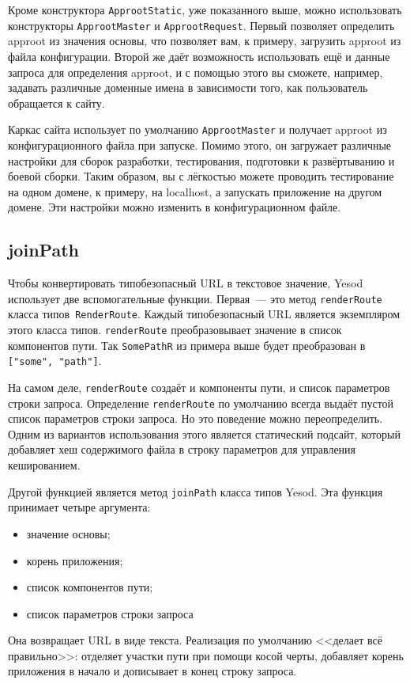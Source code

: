Кроме конструктора \lstinline!ApprootStatic!, уже показанного выше, можно
использовать конструкторы \lstinline!ApprootMaster! и
\lstinline!ApprootRequest!.  Первый позволяет определить approot из значения
основы, что позволяет вам, к примеру, загрузить approot из файла конфигурации.
Второй же даёт возможность использовать ещё и данные запроса для определения
approot, и с помощью этого вы сможете, например, задавать различные доменные
имена в зависимости того, как пользователь обращается к сайту.

Каркас сайта использует по умолчанию \lstinline!ApprootMaster!  и получает
approot из конфигурационного файла при запуске. Помимо этого, он загружает
различные настройки для сборок разработки, тестирования, подготовки к
развёртыванию и боевой сборки. Таким образом, вы с лёгкостью можете проводить
тестирование на одном домене, к примеру, на localhost, а запускать приложение
на другом домене. Эти настройки можно изменить в конфигурационном файле.

\subsection {joinPath}

Чтобы конвертировать типобезопасный URL в текстовое значение, Yesod использует
две вспомогательные функции. Первая~--- это метод \lstinline!renderRoute!
класса типов~\lstinline!RenderRoute!. Каждый типобезопасный URL является
экземпляром этого класса типов. \lstinline!renderRoute! преобразовывает
значение в список компонентов пути. Так \lstinline!SomePathR! из примера выше
будет преобразован в \lstinline!["some", "path"]!.

\begin{remark}
    На самом деле, \lstinline!renderRoute! создаёт и компоненты пути, и список
    параметров строки запроса. Определение \lstinline!renderRoute! по умолчанию
    всегда выдаёт пустой список параметров строки запроса. Но это поведение
    можно переопределить. Одним из вариантов использования этого является
    статический подсайт, который добавляет хеш содержимого файла в строку
    параметров для управления кешированием.
\end{remark}

Другой функцией является метод \lstinline!joinPath! класса типов Yesod. Эта
функция принимает четыре аргумента:
\begin{itemize}
    \item значение основы;
    \item корень приложения;
    \item список компонентов пути;
    \item список параметров строки запроса
\end{itemize}
Она возвращает URL в виде текста. Реализация по умолчанию <<делает всё
правильно>>: отделяет участки пути при помощи косой черты, добавляет корень
приложения в начало и дописывает в конец строку запроса.

